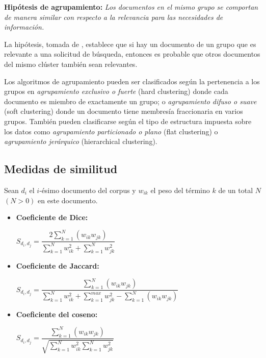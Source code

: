 \documentclass{llncs}
\begin{document}
\vspace{1em}
\textbf{Hip\'otesis de agrupamiento:} \textit{Los documentos en el mismo grupo se comportan de manera similar con respecto a la relevancia para las necesidades de información.}
	
\vspace{0.3em}
La hipótesis, tomada de \cite[Secci\'on 16.1, p.350]{B1}, establece que si hay un documento de un grupo que es relevante a una solicitud de búsqueda, entonces es probable que otros documentos del mismo clúster también sean relevantes. 
\vspace{1em}

Los algoritmos de agrupamiento pueden ser clasificados seg\'un la pertenencia a los grupos en \textit{agrupamiento exclusivo o fuerte} (hard clustering) donde cada documento es miembro de exactamente un grupo; o \textit{agrupamiento difuso o suave} (soft clustering) donde un documento tiene membresía fraccionaria en varios grupos. Tambi\'en pueden clasificarse seg\'un el tipo de estructura impuesta sobre los datos como \textit{agrupamiento particionado o plano} (flat clustering) o \textit{agrupamiento jer\'arquico} (hierarchical clustering).

\subsection{Medidas de similitud}

Sean $ d_{i} $ el $ i $-ésimo documento del corpus y $ w_{ik} $ el peso del t\'ermino $ k $ de un total $ N $ $ (N>0) $ en este documento.

\begin{itemize}
	\item \textbf{Coeficiente de Dice:}
	\begin{center}
		$ S_{d_{i}, d_{j}} = \dfrac{2 \sum_{k=1}^{N} (w_{ik}w_{jk})}{\sum_{k=1}^{N}w_{ik}^{2} + \sum_{k=1}^{N}w_{jk}^{2}} $ 
	\end{center}
	\item \textbf{Coeficiente de Jaccard:}
	\begin{center}
		$ S_{d_{i}, d_{j}} = \dfrac{\sum_{k=1}^{N} (w_{ik}w_{jk})}{\sum_{k=1}^{N}w_{ik}^{2} + \sum_{k=1}^{max}w_{jk}^{2} - \sum_{k=1}^{N} (w_{ik}w_{jk})} $
	\end{center}
	\item \textbf{Coeficiente del coseno:}
	\begin{center}
		$ S_{d_{i}, d_{j}} = \dfrac{\sum_{k=1}^{N} (w_{ik}w_{jk})}{\sqrt{\sum_{k=1}^{N}w_{ik}^{2} \sum_{k=1}^{N}w_{jk}^{2}}} $
	\end{center}
\end{itemize}
\end{document}
